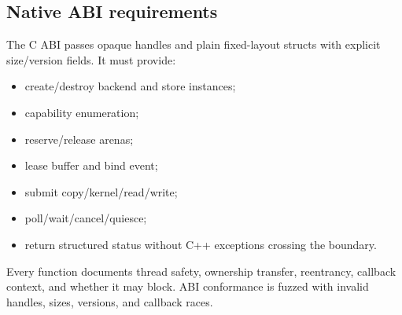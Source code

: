 \subsection{Native ABI requirements}

The C ABI passes opaque handles and plain fixed-layout structs with explicit size/version fields. It must provide:

\begin{itemize}
  \item create/destroy backend and store instances;
  \item capability enumeration;
  \item reserve/release arenas;
  \item lease buffer and bind event;
  \item submit copy/kernel/read/write;
  \item poll/wait/cancel/quiesce;
  \item return structured status without C++ exceptions crossing the boundary.
\end{itemize}

Every function documents thread safety, ownership transfer, reentrancy, callback context, and whether it may block. ABI conformance is fuzzed with invalid handles, sizes, versions, and callback races.
